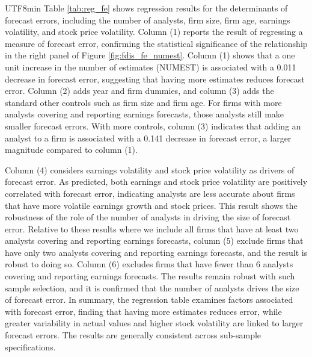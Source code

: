 \documentclass[12pt, a4paper]{article}
\begin{document}
\begin{CJK}{UTF8}{min}
Table \ref{tab:reg_fe} shows regression results for the determinants of forecast errors, including the number of analysts, firm size, firm age, earnings volatility, and stock price volatility.
Column (1) reports the result of regressing a measure of forecast error, confirming the statistical significance of the relationship in the right panel of Figure \ref{fig:fdis_fe_numest}.
Column (1) shows that a one unit increase in the number of estimates (NUMEST) is associated with a 0.011 decrease in forecast error, suggesting that having more estimates reduces forecast error.
Column (2) adds year and firm dummies, and column (3) adds the standard other controls such as firm size and firm age.
For firms with more analysts covering and reporting earnings forecasts, those analysts still make smaller forecast errors.
With more controls, column (3) indicates that adding an analyst to a firm is associated with a 0.141 decrease in forecast error, a larger magnitude compared to column (1).

\begin{table}[htbp]
\centering
\resizebox{1.0\textwidth}{!}{
\begin{threeparttable}

\begin{tablenotes}
\footnotesize
\end{tablenotes}
\end{threeparttable}
}
\caption{Regression Results for Forecast Errors}
\label{tab:reg_fe}
\end{table}

Column (4) considers earnings volatility and stock price volatility as drivers of forecast error.
As predicted, both earnings and stock price volatility are positively correlated with forecast error, indicating analysts are less accurate about firms that have more volatile earnings growth and stock prices.
This result shows the robustness of the role of the number of analysts in driving the size of forecast error.
Relative to these results where we include all firms that have at least two analysts covering and reporting earnings forecasts, 
column (5) exclude firms that have only two analysts covering and reporting earnings forecasts, and the result is robust to doing so.
Column (6) excludes firms that have fewer than 6 analysts covering and reporting earnings forecasts.
The results remain robust with such sample selection, and it is confirmed that the number of analysts drives the size of forecast error.
In summary, the regression table examines factors associated with forecast error, finding that having more estimates reduces error, while greater variability in actual values and higher stock volatility are linked to larger forecast errors. The results are generally consistent across sub-sample specifications.






\end{CJK}
\end{document}

